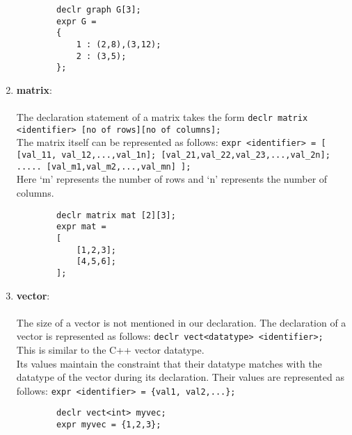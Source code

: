 \documentclass[journal, 18pt]{report}
\begin{document}
\begin{enumerate}
\begin{lstlisting}
        declr graph G[3];
        expr G = 
        {
            1 : (2,8),(3,12);
            2 : (3,5);
        };
    \end{lstlisting}
    \item \textbf{matrix}:\\\\
    The declaration statement of a matrix takes the form \texttt{declr matrix <identifier> [no of rows][no of columns];}\\
    The matrix itself can be represented as follows: \texttt{expr <identifier> = [ [val\_11, val\_12,...,val\_1n]; [val\_21,val\_22,val\_23,...,val\_2n]; ..... [val\_m1,val\_m2,...,val\_mn] ];}\\
    Here `m' represents the number of rows and `n' represents the number of columns.\\
    \begin{lstlisting}
        declr matrix mat [2][3];
        expr mat = 
        [
            [1,2,3];
            [4,5,6];
        ];
    \end{lstlisting}
    \item \textbf{vector}:\\\\
    The size of a vector is not mentioned in our declaration. The declaration of a vector is represented as follows: \texttt{declr vect<datatype> <identifier>;}\\
    This is similar to the C++ vector datatype.\\
    Its values maintain the constraint that their datatype matches with the datatype of the vector during its declaration. Their values are represented as follows: \texttt{expr <identifier> = \{val1, val2,...\};}\\
    \begin{lstlisting}
        declr vect<int> myvec;
        expr myvec = {1,2,3};
    \end{lstlisting}
\end{enumerate}
\end{document}
